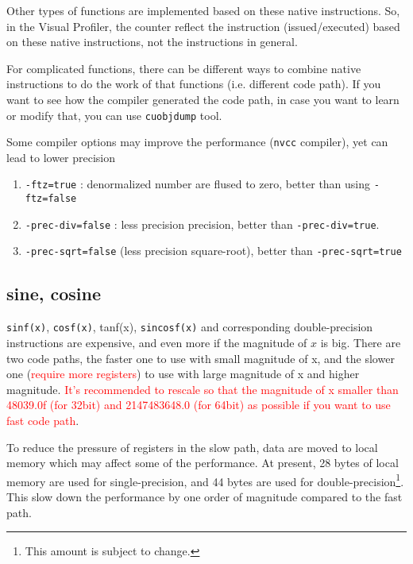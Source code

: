\begin{framed}
  
  Other types of functions are implemented based on these native
  instructions. So, in the Visual Profiler, the counter reflect the
  instruction (issued/executed) based on these native instructions, not
  the instructions in general. 

  For complicated functions, there can be different ways to combine
  native instructions to do the work of that functions (i.e. different
  code path). If you want to see how the compiler generated the code
  path, in case you want to learn or modify that, you can use
  \verb!cuobjdump! tool.
\end{framed}

Some compiler options may improve the performance (\verb!nvcc!
compiler), yet can lead to lower precision
\begin{enumerate}
\item \verb!-ftz=true! : denormalized number are flused to zero,
  better than using \verb!-ftz=false!
\item \verb!-prec-div=false! : less precision precision, better than
  \verb!-prec-div=true!.
\item  \verb!-prec-sqrt=false! (less precision square-root), better
  than \verb!-prec-sqrt=true!
\end{enumerate}

\subsection{sine, cosine}
\label{sec:sine-cosine}

\verb!sinf(x)!, \verb!cosf(x)!, tanf(x), \verb!sincosf(x)! and
corresponding double-precision instructions are expensive, and even
more if the magnitude of $x$ is big. There are two code paths, the
faster one to use with small magnitude of x, and the slower one
(\textcolor{red}{require more registers}) to use with large magnitude
of x and higher magnitude.
\textcolor{red}{It's recommended to rescale so that the magnitude of x
  smaller than 48039.0f (for 32bit) and 2147483648.0 (for 64bit) as
  possible if you want to use fast code path}.

\begin{framed}
  
  To reduce the pressure of registers in the slow path, data are moved
  to local memory which may affect some of the performance. At
  present, 28 bytes of local memory are used for single-precision, and
  44 bytes are used for
  double-precision\footnote{This amount is subject to change.}. This
  slow down the performance by one order of magnitude compared to the
  fast path.
\end{framed}


